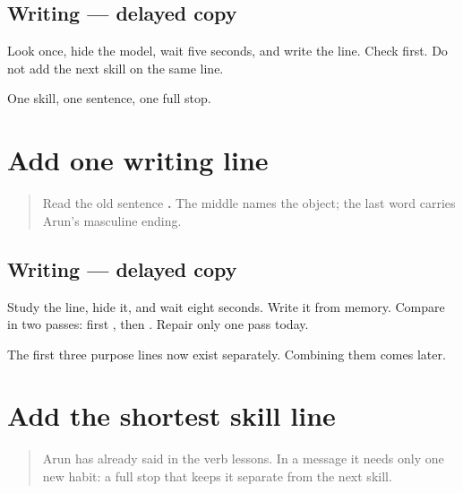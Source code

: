 \subsection*{Writing — delayed copy}
Look once, hide the model, wait five seconds, and write the line. Check \textbf{} first. Do not add the next skill on the same line.

\begin{tcolorbox}[breakable,colback=teal!4,colframe=teal!35!black,title={Before you move on}]
One skill, one sentence, one full stop.
\end{tcolorbox}
\section[\texorpdfstring{\mr{मी} \mr{माझं} \mr{नाव} \mr{लिहितो}. (mī mājhaṁ nāv …)}{मी माझं नाव लिहितो. (mī mājhaṁ nāv …)}]{Add one writing line}

\label{lesson:MR-A1M06-writing-line}



\begin{quote}
Read the old sentence \textbf{   .} The middle names the object; the last word carries Arun's masculine ending.
\end{quote}

\subsection*{Writing — delayed copy}
Study the line, hide it, and wait eight seconds. Write it from memory. Compare in two passes: first \textbf{ }, then \textbf{}. Repair only one pass today.

\begin{tcolorbox}[breakable,colback=teal!4,colframe=teal!35!black,title={Before you move on}]
The first three purpose lines now exist separately. Combining them comes later.
\end{tcolorbox}
\section[\texorpdfstring{\mr{मी} \mr{बोलतो}. (mī bolto)}{मी बोलतो. (mī bolto)}]{Add the shortest skill line}

\label{lesson:MR-A1M07-speaking-line}



\begin{quote}
Arun has already said \textbf{ } in the verb lessons. In a message it needs only one new habit: a full stop that keeps it separate from the next skill.
\end{quote}


